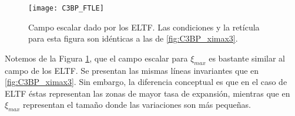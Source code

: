 \begin{figure}
 \centering
 \texttt{[image: C3BP\_FTLE]}
 \caption{Campo escalar dado por los ELTF. Las condiciones y la retícula para esta figura son idénticas a las de \ref{fig:C3BP_ximax3}.}
 \label{fig:C3BP_FTLE}
\end{figure}

Notemos de la Figura \ref{fig:C3BP_FTLE}, que el campo escalar para $\xi_{max}$ es bastante similar al campo de los ELTF. Se presentan las mismas líneas invariantes que en \ref{fig:C3BP_ximax3}. Sin embargo, la diferencia conceptual es que en el caso de ELTF éstas representan las zonas de mayor tasa de expansión, mientras que en $\xi_{max}$ representan el tamaño donde las variaciones son más pequeñas.